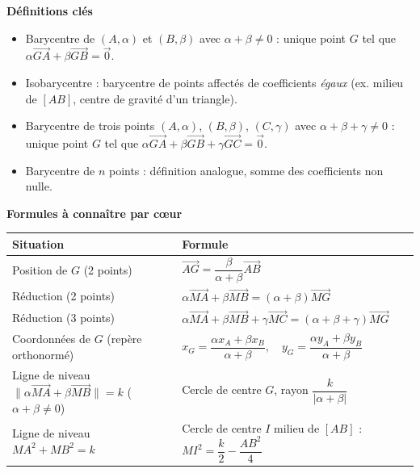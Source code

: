 \documentclass[11pt]{article}
\newcommand{\cle}[1]{{\popxbold\color{popdark}#1}}
\begin{document}
\begin{aretenir}
\textbf{Définitions clés}
\begin{itemize}
  \item \cle{Barycentre} de $(A,\alpha)$ et $(B,\beta)$ avec $\alpha+\beta\neq 0$ : unique point $G$ tel que $\alpha\overrightarrow{GA}+\beta\overrightarrow{GB}=\vec{0}$.
  \item \cle{Isobarycentre} : barycentre de points affectés de coefficients \emph{égaux} (ex. milieu de $[AB]$, centre de gravité d'un triangle).
  \item Barycentre de trois points $(A,\alpha)$, $(B,\beta)$, $(C,\gamma)$ avec $\alpha+\beta+\gamma\neq 0$ : unique point $G$ tel que $\alpha\overrightarrow{GA}+\beta\overrightarrow{GB}+\gamma\overrightarrow{GC}=\vec{0}$.
  \item Barycentre de $n$ points : définition analogue, somme des coefficients non nulle.
\end{itemize}

\textbf{Formules à connaître par cœur}
\begin{center}
\begin{tabularx}{\linewidth}{|l|X|}
\hline
\rowcolor{popblueL} \textbf{Situation} & \textbf{Formule} \\
\hline
Position de $G$ (2 points) & $\overrightarrow{AG}=\dfrac{\beta}{\alpha+\beta}\overrightarrow{AB}$ \\
\hline
Réduction (2 points) & $\alpha\overrightarrow{MA}+\beta\overrightarrow{MB}=(\alpha+\beta)\overrightarrow{MG}$ \\
\hline
Réduction (3 points) & $\alpha\overrightarrow{MA}+\beta\overrightarrow{MB}+\gamma\overrightarrow{MC}=(\alpha+\beta+\gamma)\overrightarrow{MG}$ \\
\hline
Coordonnées de $G$ (repère orthonormé) & $x_G=\dfrac{\alpha x_A+\beta x_B}{\alpha+\beta},\quad y_G=\dfrac{\alpha y_A+\beta y_B}{\alpha+\beta}$ \\
\hline
Ligne de niveau $\|\alpha\overrightarrow{MA}+\beta\overrightarrow{MB}\|=k$ ($\alpha+\beta\neq 0$) & Cercle de centre $G$, rayon $\dfrac{k}{|\alpha+\beta|}$ \\
\hline
Ligne de niveau $MA^2+MB^2=k$ & Cercle de centre $I$ milieu de $[AB]$ : $MI^2=\dfrac{k}{2}-\dfrac{AB^2}{4}$ \\
\hline
\end{tabularx}
\end{center}


\end{aretenir}
\end{document}
